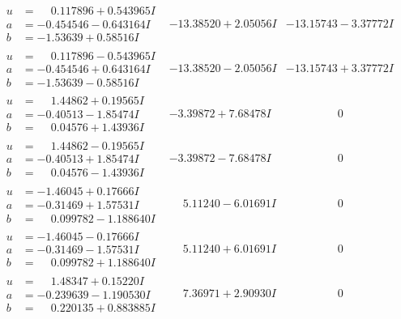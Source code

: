 \documentclass[1p]{elsarticle_modified}
\theoremstyle{definition}
\begin{document}
$$\begin{array}{c|c|c}
\begin{aligned}
u &= \phantom{-}0.117896 + 0.543965 I \\
a &= -0.454546 - 0.643164 I \\
b &= -1.53639 + 0.58516 I\end{aligned}
 & -13.38520 + 2.05056 I & -13.15743 - 3.37772 I \\ \hline\begin{aligned}
u &= \phantom{-}0.117896 - 0.543965 I \\
a &= -0.454546 + 0.643164 I \\
b &= -1.53639 - 0.58516 I\end{aligned}
 & -13.38520 - 2.05056 I & -13.15743 + 3.37772 I \\ \hline\begin{aligned}
u &= \phantom{-}1.44862 + 0.19565 I \\
a &= -0.40513 - 1.85474 I \\
b &= \phantom{-}0.04576 + 1.43936 I\end{aligned}
 & -3.39872 + 7.68478 I & \phantom{-0.000000 } 0 \\ \hline\begin{aligned}
u &= \phantom{-}1.44862 - 0.19565 I \\
a &= -0.40513 + 1.85474 I \\
b &= \phantom{-}0.04576 - 1.43936 I\end{aligned}
 & -3.39872 - 7.68478 I & \phantom{-0.000000 } 0 \\ \hline\begin{aligned}
u &= -1.46045 + 0.17666 I \\
a &= -0.31469 + 1.57531 I \\
b &= \phantom{-}0.099782 - 1.188640 I\end{aligned}
 & \phantom{-}5.11240 - 6.01691 I & \phantom{-0.000000 } 0 \\ \hline\begin{aligned}
u &= -1.46045 - 0.17666 I \\
a &= -0.31469 - 1.57531 I \\
b &= \phantom{-}0.099782 + 1.188640 I\end{aligned}
 & \phantom{-}5.11240 + 6.01691 I & \phantom{-0.000000 } 0 \\ \hline\begin{aligned}
u &= \phantom{-}1.48347 + 0.15220 I \\
a &= -0.239639 - 1.190530 I \\
b &= \phantom{-}0.220135 + 0.883885 I\end{aligned}
 & \phantom{-}7.36971 + 2.90930 I & \phantom{-0.000000 } 0 \\ \hline\begin{aligned}

\end{aligned}
\end{array}$$
\end{document}
